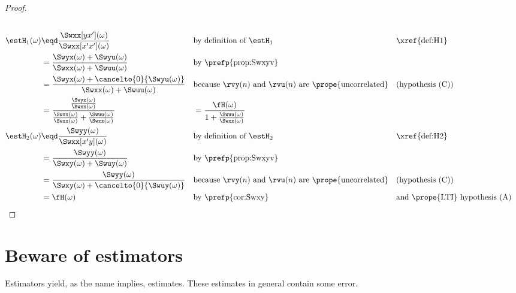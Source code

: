\begin{proof}
\begin{align*}
  \\
  \estH_1(\omega)
    &\eqd \frac{\Swxx[yx'](\omega)}{\Swxx[x'x'](\omega)}
    && \text{by definition of $\estH_1$}
    && \text{\xref{def:H1}}
  \\&= \frac{\Swyx(\omega) + \Swyu(\omega)}
            {\Swxx(\omega) + \Swuu(\omega)}
    && \text{by \prefp{prop:Swxyv}}
  \\&= \frac{\Swyx(\omega) + \cancelto{0}{\Swyu(\omega)}}
            {\Swxx(\omega) + \Swuu(\omega)}
    && \text{because $\rvy(n)$ and $\rvu(n)$ are \prope{uncorrelated}}
    && \text{(hypothesis (C))}
  \\&= \frac{\frac{\Swyx(\omega)}{\Swxx(\omega)}}
            {\frac{\Swxx(\omega)}{\Swxx(\omega)} + \frac{\Swuu(\omega)}{\Swxx(\omega)}}
   &&= \frac{\fH(\omega)}
            {1 + \frac{\Swuu(\omega)}{\Swxx(\omega)}}
  \\
  \estH_2(\omega)
    &\eqd \frac{\Swyy(\omega)}{\Swxx[x'y](\omega)}
    && \text{by definition of $\estH_2$}
    && \text{\xref{def:H2}}
  \\&= \frac{\Swyy(\omega)}{\Swxy(\omega) + \Swuy(\omega)}
    && \text{by \prefp{prop:Swxyv}}
  \\&= \frac{\Swyy(\omega)}{\Swxy(\omega) + \cancelto{0}{\Swuy(\omega)}}
    && \text{because $\rvy(n)$ and $\rvu(n)$ are \prope{uncorrelated}}
    && \text{(hypothesis (C))}
  \\&= \fH(\omega)
    && \text{by \prefp{cor:Swxy}}
    && \text{and \prope{LTI} hypothesis (A)}
\end{align*}
\end{proof}

\section{Beware of estimators}
Estimators yield, as the name implies, estimates.
These estimates in general contain some error.

